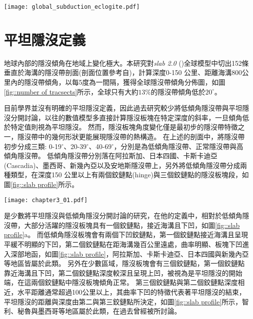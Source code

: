 \begin{figure*}[hp]
    \centering
    \texttt{[image: global\_subduction\_eclogite.pdf]}
    \caption[全球隱沒板塊頂部的預測P-T路徑圖，摘自\citet{penniston2015global}]{
    全球隱沒板塊頂部的預測P-T路徑圖，摘自\citet{penniston2015global}。圖中標示每公里5$^\circ$、10$^\circ$、20$^\circ$的地溫梯度與藍閃岩、榴輝岩溫壓位置。(a)來自\citet{syracuse2010global}的全球隱沒板塊P-T路徑圖(紫色線)。(b)來自\citet{gerya2002exhumation}的模型，紅色線代表不同年齡的隱沒板塊P-T路徑圖。
    }
    \label{fig::global_subduction_eclogite}
\end{figure*}

\section{平坦隱沒定義}\label{平坦隱沒定義}

地球內部的隱沒傾角在地域上變化極大。本研究對\textsl{slab 2.0} (\citealp{hayes2018slab2})全球模型中切出152條垂直於海溝的隱沒帶剖面(剖面位置參考自\citealp{Hu2020})，計算深度0-150 公里、距離海溝800公里內的隱沒帶傾角，以每5度為一間隔，獲得全球隱沒帶傾角分佈圖，如圖\ref{fig::number of tracsects}所示，全球只有大約$13\%$的隱沒帶傾角低於$20^\circ$。

目前學界並沒有明確的平坦隱沒定義，因此過去研究較少將低傾角隱沒帶與平坦隱沒分開討論，以往的數值模型多直接計算隱沒板塊在特定深度的斜率，一旦傾角低於特定值則視為平坦隱沒。
然而，隱沒板塊角度變化僅是最初步的隱沒帶特徵之一，隱沒帶中的幾何形狀更能展現隱沒帶的熱構造。
在上述的剖面中，將隱沒帶初步分成三類: 0-19$^\circ$、20-39$^\circ$、40-69$^\circ$，分別是為低傾角隱沒帶、正常隱沒帶與高傾角隱沒帶。
低傾角隱沒帶分別落在阿拉斯加、日本四國、卡斯卡迪亞(Cascadia)、墨西哥、新幾內亞以及安地斯隱沒帶上，\citet{schellart2020control}另外將低傾角隱沒帶分成兩種類型，在深度150 公里以上有兩個鉸鏈點(hinge)與三個鉸鏈點的隱沒板塊段，如圖\ref{fig::slab profile}所示。

\begin{figure*}[ht!]
    \centering
    \texttt{[image: chapter3\_01.pdf]}
    \caption[全球152條隱沒帶剖面傾角長條分布圖]{全球152條隱沒帶剖面傾角長條分布圖，其中綠底為隱沒剖面傾角低於20$^{\circ}$的剖面個數，佔整體13$\%$;粉紅底為剖面傾角介於20$^{\circ}$-39$^\circ$之間的剖面個數，佔整體73$\%$，粉藍底則為剖面傾角高於40$^\circ$的剖面個數，佔總體14$\%$。}
    \label{fig::number of tracsects}
\end{figure*}

\citet{schellart2020control}是少數將平坦隱沒與低傾角隱沒分開討論的研究，在他的定義中，相對於低傾角隱沒帶，大部分活躍的隱沒板塊具有一個鉸鏈點，接近海溝且下凹，如圖\ref{fig::slab profile}a。
而低傾角隱沒板塊會有兩個下凹鉸鏈點，第一個鉸鏈點接近海溝且呈現平緩不明顯的下凹，第二個鉸鏈點在距海溝幾百公里遠處，曲率明顯、板塊下凹進入深部地函，如圖\ref{fig::slab profile}，阿拉斯加、卡斯卡迪亞、日本四國與新幾內亞等地區皆屬於此類。
另外在少數區域，隱沒板塊會有三個鉸鏈點，第一個鉸鏈點靠近海溝且下凹，第二個鉸鏈點深度較深且呈現上凹，被視為是平坦隱沒的開始端，在這兩個鉸鏈點中隱沒板塊傾角正常。
第三個鉸鏈點與第二個鉸鏈點深度相近，水平距離通常超過100公里以上，其曲率下凹的特徵代表著平坦隱沒的結束，平坦隱沒的距離與深度由第二與第三鉸鏈點所決定，如圖\ref{fig::slab profile}所示，智利、秘魯與墨西哥等地區屬於此類，在過去曾經被\citet{Manea2017}所討論。


